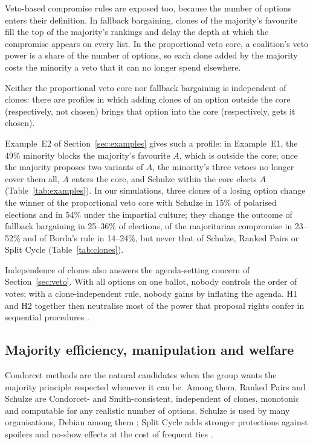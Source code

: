 Veto-based compromise rules are exposed too, because the number of options enters their definition. In
fallback bargaining, clones of the majority's favourite fill the top of the majority's rankings and delay
the depth at which the compromise appears on every list. In the proportional veto core, a coalition's
veto power is a share of the number of options, so each clone added by the majority costs the minority a
veto that it can no longer spend elsewhere.

\begin{proposition}\label{prop:pvc-clones}
Neither the proportional veto core nor fallback bargaining is independent of clones: there are profiles
in which adding clones of an option outside the core (respectively, not chosen) brings that option into
the core (respectively, gets it chosen).
\end{proposition}

Example~E2 of Section~\ref{sec:examples} gives such a profile: in Example~E1, the 49\% minority blocks the
majority's favourite $A$, which is outside the core; once the majority proposes two variants of $A$, the
minority's three vetoes no longer cover them all, $A$ enters the core, and Schulze within the core elects
$A$ (Table~\ref{tab:examples}). In our simulations, three clones of a losing option change the winner of
the proportional veto core with Schulze in 15\% of polarised elections and in 54\% under the impartial
culture; they change the outcome of fallback bargaining in 25--36\% of elections, of the majoritarian
compromise in 23--52\% and of Borda's rule in 14--24\%, but never that of Schulze, Ranked Pairs or Split
Cycle (Table~\ref{tab:clones}).

Independence of clones also answers the agenda-setting concern of Section~\ref{sec:veto}. With all
options on one ballot, nobody controls the order of votes; with a clone-independent rule, nobody gains
by inflating the agenda. H1 and H2 together then neutralise most of the power that proposal rights confer
in sequential procedures \citep{BaronFerejohn1989,BarberaGerber2017}.

\subsection{Majority efficiency, manipulation and welfare}

Condorcet methods are the natural candidates when the group wants the majority principle respected
whenever it can be. Among them, Ranked Pairs and Schulze are Condorcet- and Smith-consistent, independent
of clones, monotonic and computable for any realistic number of options. Schulze is used by many organisations, Debian among them
\citep{Debian2024constitution}; Split Cycle adds stronger protections against spoilers and no-show effects at the cost of
frequent ties \citep{HollidayPacuit2023splitcycle}.

